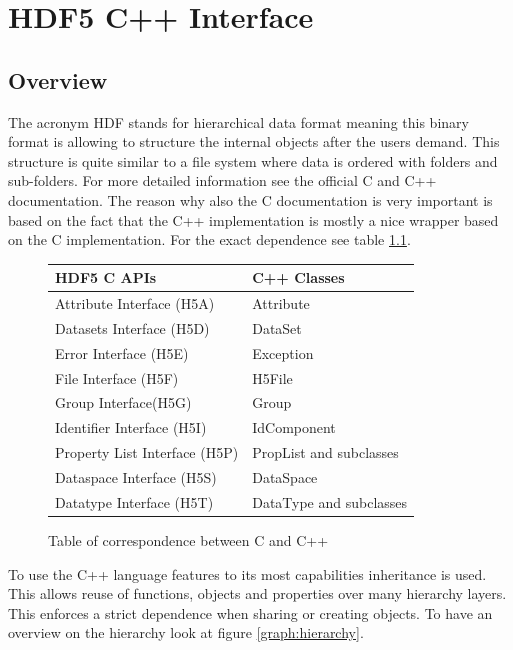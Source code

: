 \chapter{HDF5 C++ Interface}
\section{Overview}
The acronym HDF stands for hierarchical data format meaning this binary format is allowing to structure the internal objects after the users demand. This structure is quite similar to a file system where data is ordered with folders and sub-folders. For more detailed information see the official C \cite{hdf5cdoc} and C++ \cite{hdf5cppdoc} documentation. The reason why also the C documentation is very important is based on the fact that the C++ implementation is mostly a nice wrapper based on the C implementation. For the exact dependence see table \ref{table:corrs}.
\begin{figure}[ht!]
\centering
\begin{tabular}{|l|l|}
\hline
HDF5 C APIs&C++ Classes\\
\hline
Attribute Interface (H5A)&Attribute\\
Datasets Interface (H5D)&DataSet\\
Error Interface (H5E)&Exception\\
File Interface (H5F)&H5File\\
Group Interface(H5G)&Group\\
Identifier Interface (H5I)&IdComponent\\
Property List Interface (H5P)&PropList and subclasses\\
Dataspace Interface (H5S)&DataSpace\\
Datatype Interface (H5T)&DataType and subclasses\\
\hline
\end{tabular}
\caption{Table of correspondence between C and C++}
\label{table:corrs}
\end{figure}
To use the C++ language features to its most capabilities inheritance is used. This allows reuse of functions, objects and properties over many hierarchy layers. This enforces a strict dependence when sharing or creating objects. To have an overview on the hierarchy look at figure \ref{graph:hierarchy}.

